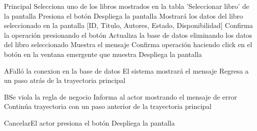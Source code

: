 
\begin{UCtrayectoria}{Principal}
		\UCpaso[\UCactor] Selecciona uno de los libros mostrados en la tabla 'Seleccionar libro' de la pantalla 
		\UCpaso[\UCactor] Presiona el botón  
		\UCpaso[\UCsist] Despliega la pantalla 
		\UCpaso[\UCsist] Mostrará los datos del libro seleccionado en la pantalla [ID, Titulo, Autores, Estado, Disponibilidad]
		\UCpaso[\UCactor] Confirma la operación presionando el botón  
		\UCpaso[\UCactor] Actualiza la base de datos eliminando los datos del libro seleccionado 
		\UCpaso[\UCsist] Muestra el mensaje 
		\UCpaso[\UCactor] Confirma operación haciendo click en el botón  en la ventana emergente que muestra
		\UCpaso[\UCsist] Despliega la pantalla 
\end{UCtrayectoria}




\begin{UCtrayectoriaA}{A}{Falló la conexion en la base de datos}
			\UCpaso[\UCsist] El sistema mostrará el mensaje 
			\UCpaso[\UCsist] Regresa a un paso atrás de la trayectoria principal 
\end{UCtrayectoriaA}


\begin{UCtrayectoriaA}{B}{Se viola la regla de negocio }	
			\UCpaso[\UCsist] Informa al actor mostrando el mensaje de error 
			\UCpaso[\UCsist] Continúa trayectoria con un paso anterior de la trayectoria principal 
\end{UCtrayectoriaA}


\begin{UCtrayectoriaA}{Cancelar}{El actor presiona el botón }
			\UCpaso[\UCsist] Despliega la pantalla 
\end{UCtrayectoriaA}